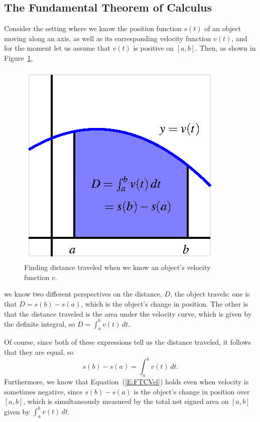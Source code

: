 

\subsection*{The Fundamental Theorem of Calculus} 

Consider the setting where we know the position function $s(t)$ of an object moving along an axis, as well as its corresponding velocity function $v(t)$, and for the moment let us assume that $v(t)$ is positive on $[a,b]$.  Then, as shown in Figure~\ref{F:4.4.FTCVel},
\begin{figure}[h]
\begin{center}
\includegraphics{figures/4_4_FTCVel.eps}
\caption{Finding distance traveled when we know an object's velocity function $v$.} \label{F:4.4.FTCVel}
\end{center}
\end{figure}
we know two different perspectives on the distance, $D$, the object travels: one is that $D = s(b) - s(a)$, which is the object's change in position.  The other is that the distance traveled is the area under the velocity curve, which is given by the definite integral, so $D = \int_a^b v(t) \, dt$.

Of course, since both of these expressions tell us the distance traveled, it follows that they are equal, so
\begin{equation} \label{E:FTCVel}
s(b) - s(a) = \int_a^b v(t) \, dt.
\end{equation}
Furthermore, we know that Equation~(\ref{E:FTCVel}) holds even when velocity is sometimes negative, since $s(b) - s(a)$ is the object's change in position over $[a,b]$, which is simultaneously measured by the total net signed area on $[a,b]$ given by $\int_a^b v(t) \, dt$.

